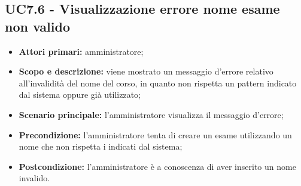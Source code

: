 \documentclass[AnalisiDeiRequisiti.tex]{subfiles}
\begin{document}
\subsection{UC7.6 - Visualizzazione errore nome esame non valido}
\begin{itemize}
	\item \textbf{Attori primari:} amministratore;
	\item \textbf{Scopo e descrizione:} viene mostrato un messaggio d'errore relativo all'invalidità del nome del corso, in quanto non rispetta un pattern indicato dal sistema oppure già utilizzato;
	\item \textbf{Scenario principale:} l'amministratore visualizza il messaggio d'errore;
	\item \textbf{Precondizione:} l'amministratore tenta di creare un esame utilizzando un nome che non rispetta i  indicati dal sistema; 
	\item \textbf{Postcondizione:} l'amministratore è a conoscenza di aver inserito un nome invalido.
\end{itemize}
\end{document}
